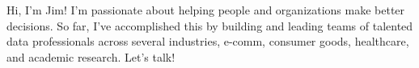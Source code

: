 \begin {cvsummary}

Hi, I'm Jim! I'm passionate about helping people and organizations make better decisions. So far, I've accomplished this by building and leading teams of talented data professionals across several industries, e-comm, consumer goods, healthcare, and academic research. Let's talk!

\end {cvsummary}
